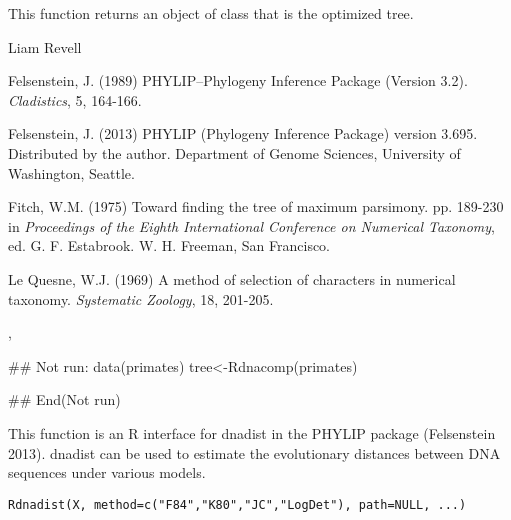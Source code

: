 \documentclass[a4paper]{book}
\begin{document}
%
\begin{Value}
This function returns an object of class  that is the optimized tree.
\end{Value}
%
\begin{Author}\relax
Liam Revell 
\end{Author}
%
\begin{References}\relax
Felsenstein, J. (1989) PHYLIP--Phylogeny Inference Package (Version 3.2). \emph{Cladistics}, 5, 164-166.

Felsenstein, J. (2013) PHYLIP (Phylogeny Inference Package) version 3.695. Distributed by the author. Department of Genome Sciences, University of Washington, Seattle.

Fitch, W.M. (1975) Toward finding the tree of maximum parsimony. pp. 189-230 in \emph{Proceedings of the Eighth International Conference on Numerical Taxonomy}, ed. G. F. Estabrook. W. H. Freeman, San Francisco.

Le Quesne, W.J. (1969) A method of selection of characters in numerical taxonomy. \emph{Systematic Zoology}, 18, 201-205. 
\end{References}
%
\begin{SeeAlso}\relax
{}, 
\end{SeeAlso}
%
\begin{Examples}
\begin{ExampleCode}
## Not run: 
data(primates)
tree<-Rdnacomp(primates)

## End(Not run)
\end{ExampleCode}
\end{Examples}
%
\begin{Description}\relax
This function is an R interface for dnadist in the PHYLIP package (Felsenstein 2013). dnadist can be used to estimate the evolutionary distances between DNA sequences under various models.
\end{Description}
%
\begin{Usage}
\begin{verbatim}
Rdnadist(X, method=c("F84","K80","JC","LogDet"), path=NULL, ...)
\end{verbatim}
\end{Usage}
%
\end{document}
